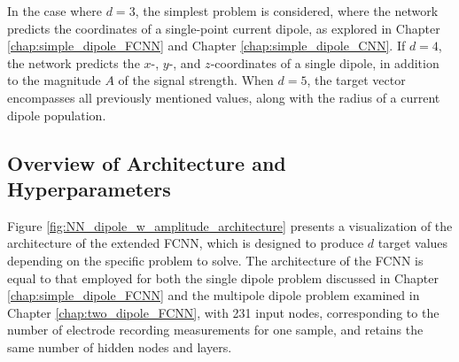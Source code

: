 \documentclass[a4paper, UKenglish, 11pt]{uiomaster}
\begin{document}
In the case where $d = 3$, the simplest problem is considered, where the network predicts the coordinates of a single-point current dipole, as explored in Chapter \ref{chap:simple_dipole_FCNN} and Chapter \ref{chap:simple_dipole_CNN}. If $d = 4$, the network predicts the $x$-, $y$-, and $z$-coordinates of a single dipole, in addition to the magnitude $A$ of the signal strength. When $d = 5$, the target vector encompasses all previously mentioned values, along with the radius of a current dipole population.



\subsection{Overview of Architecture and Hyperparameters}

Figure \ref{fig:NN_dipole_w_amplitude_architecture} presents a visualization of the architecture of the extended FCNN, which is designed to produce $d$ target values depending on the specific problem to solve. The architecture of the FCNN is equal to that employed for both the single dipole problem discussed in Chapter \ref{chap:simple_dipole_FCNN} and the multipole dipole problem examined in Chapter \ref{chap:two_dipole_FCNN}, with 231 input nodes, corresponding to the number of electrode recording measurements for one sample, and retains the same number of hidden nodes and layers.
\end{document}

